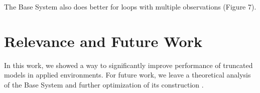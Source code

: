 \documentclass{acm_proc_article-sp}
\begin{document}
The Base System also does better for loops with multiple observations (Figure 7).


\section{Relevance and Future Work}
In this work, we showed a way to significantly improve performance of truncated models in applied environments. For future work, we leave a theoretical analysis of the Base System and further optimization of its construction .

%

%
\end{document}
